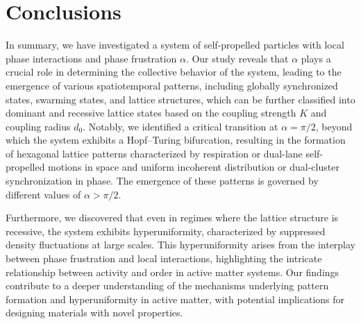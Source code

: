\documentclass{article}
\begin{document}
\section{\label{sec:conclusions}Conclusions}
In summary, we have investigated a system of self-propelled particles with local phase interactions and phase frustration $\alpha$. Our study reveals that $\alpha$ plays a crucial role in determining the collective behavior of the system, leading to the emergence of various spatiotemporal patterns, including globally synchronized states, swarming states, and lattice structures, which can be further classified into dominant and recessive lattice states based on the coupling strength $K$ and coupling radius $d_0$.
Notably, we identified a critical transition at $\alpha = \pi/2$, beyond which the system exhibits a Hopf–Turing bifurcation, resulting in the formation of hexagonal lattice patterns characterized by respiration or dual-lane self-propelled motions in space and uniform incoherent distribution or dual-cluster synchronization in phase. The emergence of these patterns is governed by different values of $\alpha > \pi/2$.

Furthermore, we discovered that even in regimes where the lattice structure is recessive, the system exhibits hyperuniformity, characterized by suppressed density fluctuations at large scales. This hyperuniformity arises from the interplay between phase frustration and local interactions, highlighting the intricate relationship between activity and order in active matter systems. Our findings contribute to a deeper understanding of the mechanisms underlying pattern formation and hyperuniformity in active matter, with potential implications for designing materials with novel properties.


\end{document}

